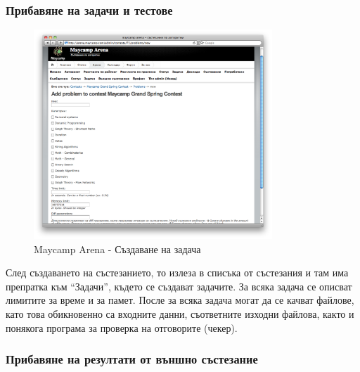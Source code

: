 \documentclass[a4paper,12pt]{article}
\begin{document}
  \pagebreak
  
  \subsubsection{Прибавяне на задачи и тестове}

  \begin{figure}[ht]
    \begin{center}
      \includegraphics[width=0.8\textwidth]{maycamp_arena_admin_problem.png}
    \end{center}
    \caption{Maycamp Arena - Създаване на задача}
    \label{arena_admin_problem}
  \end{figure}
  
  След създаването на състезанието, то излеза в списъка от състезания и там има препратка към ``Задачи'', където се създават задачите. За всяка задача се описват лимитите за време и за памет. После за всяка задача могат да се качват файлове, като това обикновенно са входните данни, съответните изходни файлова, както и понякога програма за проверка на отговорите (чекер).
  
  \pagebreak
  
  \subsubsection{Прибавяне на резултати от външно състезание}
\end{document}
